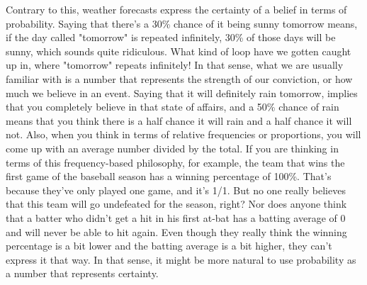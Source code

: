 \documentclass{ltjsbook}
\begin{document}
Contrary to this, weather forecasts express the certainty of a belief in terms of probability. Saying that there's a 30\% chance of it being sunny tomorrow means, if the day called "tomorrow" is repeated infinitely, 30\% of those days will be sunny, which sounds quite ridiculous. What kind of loop have we gotten caught up in, where "tomorrow" repeats infinitely!
In that sense, what we are usually familiar with is a number that represents the strength of our conviction, or how much we believe in an event. Saying that it will definitely rain tomorrow, implies that you completely believe in that state of affairs, and a 50\% chance of rain means that you think there is a half chance it will rain and a half chance it will not. Also, when you think in terms of relative frequencies or proportions, you will come up with an average number divided by the total. If you are thinking in terms of this frequency-based philosophy, for example, the team that wins the first game of the baseball season has a winning percentage of 100\%. That's because they've only played one game, and it's 1/1. But no one really believes that this team will go undefeated for the season, right? Nor does anyone think that a batter who didn't get a hit in his first at-bat has a batting average of 0 and will never be able to hit again. Even though they really think the winning percentage is a bit lower and the batting average is a bit higher, they can't express it that way. In that sense, it might be more natural to use probability as a number that represents certainty.
\end{document}
